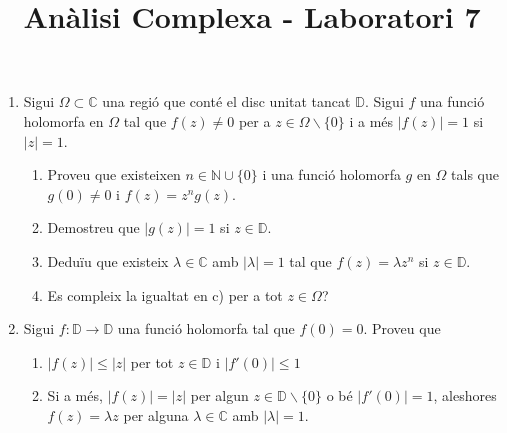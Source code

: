 \documentclass[10pt,a4paper]{article}
\author{ }
\title{Anàlisi Complexa - Laboratori 7}
\begin{document}
\maketitle

\begin{enumerate}
\item Sigui $\Omega\subset\mathbb{C}$ una regió que conté el disc unitat tancat $\mathbb{D}$. Sigui $f$ una funció
holomorfa en $\Omega$ tal que $f(z)\neq 0$ per a $z\in\Omega\backslash\{0\}$ i a més $|f(z)| = 1$ si $|z| = 1$.
	\begin{enumerate}
	\item Proveu que existeixen $n\in\mathbb{N}\cup\{0\}$ i una funció holomorfa $g$ en $\Omega$ tals que $g(0)\neq 0$ i $f(z) = z^{n}g(z)$. 
	\begin{framed}
	
	\end{framed}
	\item Demostreu que $|g(z)| = 1$ si $z\in\mathbb{D}$.
	\begin{framed}
	
	\end{framed}
	\item Deduïu que existeix $\lambda\in\mathbb{C}$ amb $|\lambda| = 1$ tal que $f(z) = \lambda z^{n}$ si $z\in\mathbb{D}$.
	\begin{framed}
	
	\end{framed}
	\item Es compleix la igualtat en c) per a tot $z\in\Omega$?
	\begin{framed}
	
	\end{framed}
	\end{enumerate}
\item Sigui $f:\mathbb{D} \rightarrow \mathbb{D}$ una funció holomorfa tal que $f(0) = 0$. Proveu que
	\begin{enumerate}
	\item $|f(z)|\leq|z|$ per tot $z\in\mathbb{D}$ i $|f'(0)|\leq 1$
	\begin{framed}
	
	\end{framed}
	\item Si a més, $|f(z)| = |z|$ per algun $z\in\mathbb{D}\backslash\{0\}$ o bé $|f'(0)| = 1$, aleshores $f(z) = \lambda z$ per alguna $\lambda\in\mathbb{C}$ amb $|\lambda| = 1$.
	\begin{framed}
	
	\end{framed}
	\end{enumerate}			
\end{enumerate}
\end{document}
